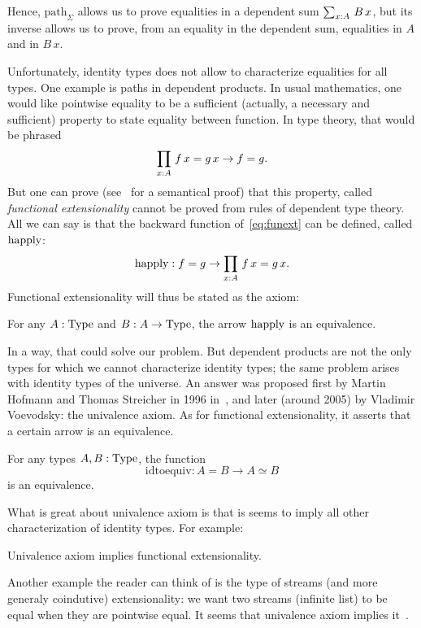 Hence, $\mathrm{path}_\Sigma$ allows us to prove equalities in a
dependent sum $\sum_{x:A}\, B\, x$, but its inverse allows us to prove,
from an equality in the dependent sum, equalities in $A$ and in $B\, x$.

Unfortunately, identity types does not allow to characterize
equalities for all types. One example is paths in dependent
products. In usual mathematics, one would like pointwise equality to
be a sufficient (actually, a necessary and sufficient) property to
state equality between function. In type theory, that would be phrased
\begin{equation}\label{eq:funext}
 \prod_{x:A}\, f\, x = g\, x \to f = g.  
\end{equation}
But one can prove (see~\cite{streicher93} for a semantical proof) that
this property, called {\em functional extensionality} cannot be proved
from rules of dependent type theory.
All we can say is that the backward function of~\ref{eq:funext} can be
defined, called $\mathrm{happly}$:
\[ \mathrm{happly}: f = g \to \prod_{x:A}\, f\, x = g\, x. \]
Functional extensionality will thus be stated as the axiom:
\begin{ax}
  For any $A:\operatorname{Type}$ and $B:A\to\operatorname{Type}$, the arrow $\mathrm{happly}$ is an equivalence.
\end{ax}
In a way, that could solve our problem. But dependent products are not
the only types for which we cannot characterize identity types; the
same problem arises with identity types of the universe. An answer was
proposed first by Martin Hofmann and Thomas Streicher in 1996
in~\cite{Hofmann96thegroupoid}, and later (around 2005) by Vladimir
Voevodsky: the univalence axiom. As for functional extensionality, it
asserts that a certain arrow is an equivalence.

\begin{ax}
  For any types $A,B:\operatorname{Type}$, the function
  \[ \mathrm{idtoequiv} : A = B \to A\simeq B \]
  is an equivalence.
\end{ax}

What is great about univalence axiom is that is seems to imply all
other characterization of identity types. For example:
\begin{lem}
  Univalence axiom implies functional extensionality.
\end{lem}
Another example the reader can think of is the type of streams (and more generaly coindutive) extensionality:
we want two streams (infinite list) to be equal when they are
pointwise equal. It seems that univalence axiom implies it~\cite{licata14uafs}.

